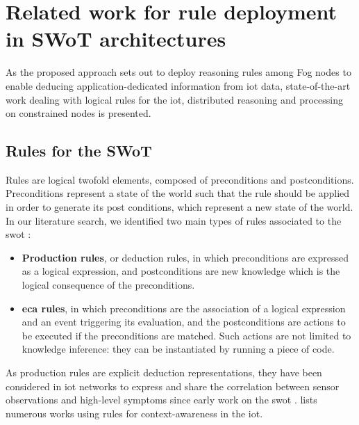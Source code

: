 \documentclass{iosart2c}
\begin{document}

\section{Related work for rule deployment in SWoT architectures}
\label{sec:related_work_distribution}

As the proposed approach sets out to deploy reasoning rules among Fog nodes to enable deducing application-dedicated information from \gls{iot} data, state-of-the-art work dealing with logical rules for the \gls{iot}, distributed reasoning and processing on constrained nodes is presented.

\subsection{Rules for the SWoT}
\label{subs:rules}

Rules are logical twofold elements, composed of preconditions and postconditions.
Preconditions represent a state of the world such that the rule should be applied in order to generate its post conditions, which represent a new state of the world.
In our literature search, we identified two main types of rules associated to the \gls{swot} \cite{Boley2007}:
\begin{itemize}
	\item \textbf{Production rules}, or deduction rules, in which preconditions are expressed as a logical expression, and postconditions are new knowledge which is the logical consequence of the preconditions.
	\item \textbf{\gls{eca} rules}, in which preconditions are the association of a logical expression and an event triggering its evaluation, and the postconditions are actions to be executed if the preconditions are matched. 
	Such actions are not limited to knowledge inference: they can be instantiated by running a piece of code.
\end{itemize}

As production rules are explicit deduction representations, they have been considered in \gls{iot} networks to express and share the correlation between sensor observations and high-level symptoms since early work on the \gls{swot} \cite{AmitSheth30}.
\cite{Sezer2018} lists numerous works using rules for context-awareness in the \gls{iot}.
\end{document}
